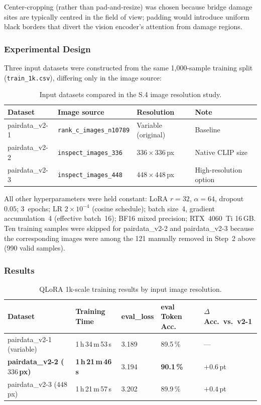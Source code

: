 ﻿\documentclass[onecolumn]{article}
\begin{document}
Center-cropping (rather than pad-and-resize) was chosen because
bridge damage sites are typically centred in the field of view;
padding would introduce uniform black borders that divert the
vision encoder's attention from damage regions.

\subsubsection*{Experimental Design}

Three input datasets were constructed from the same 1{,}000-sample
training split (\texttt{train\_1k.csv}), differing only in the image source:

\begin{table}[h]
\centering
\caption{Input datasets compared in the S.4 image resolution study.}
\label{tab:s4_datasets}
\small
\begin{tabular}{llll}
\toprule
\textbf{Dataset} & \textbf{Image source} & \textbf{Resolution} & \textbf{Note} \\
\midrule
pairdata\_v2-1 & \texttt{rank\_c\_images\_n10789} & Variable (original) & Baseline \\
pairdata\_v2-2 & \texttt{inspect\_images\_336}   & $336\times336$\,px  & Native CLIP size \\
pairdata\_v2-3 & \texttt{inspect\_images\_448}   & $448\times448$\,px  & High-resolution option \\
\bottomrule
\end{tabular}
\end{table}

\noindent
All other hyperparameters were held constant:
LoRA $r{=}32$, $\alpha{=}64$, dropout $0.05$;
3~epochs; LR $2\times10^{-4}$ (cosine schedule);
batch size~4, gradient accumulation~4 (effective batch~16);
BF16 mixed precision; RTX~4060~Ti 16\,GB.
Ten training samples were skipped for pairdata\_v2-2 and pairdata\_v2-3
because the corresponding images were among the 121 manually removed in
Step~2 above (990 valid samples).

\subsubsection*{Results}

\begin{table}[h]
\centering
\caption{QLoRA 1k-scale training results by input image resolution.}
\label{tab:s4_results}
\small
\begin{tabular}{lllll}
\toprule
\textbf{Dataset} & \textbf{Training Time} & \textbf{eval\_loss} &
\textbf{eval Token Acc.} & \textbf{$\Delta$ Acc.\ vs.\ v2-1} \\
\midrule
pairdata\_v2-1 (variable) & 1\,h\,34\,m\,53\,s & 3.189 & 89.5\,\% & --- \\
\textbf{pairdata\_v2-2 ($336$\,px)} & \textbf{1\,h\,21\,m\,46\,s} & 3.194 & \textbf{90.1\,\%} & $+0.6$\,pt \\
pairdata\_v2-3 ($448$\,px) & 1\,h\,21\,m\,57\,s & 3.202 & 89.9\,\% & $+0.4$\,pt \\
\bottomrule
\end{tabular}
\end{table}
\end{document}
